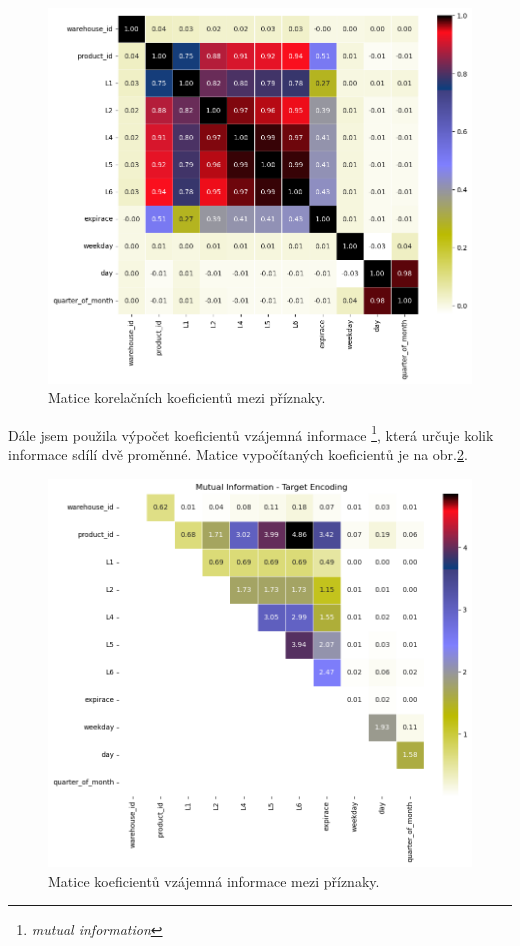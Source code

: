 \begin{figure}[hbtp!]
    \centering
    \includegraphics[width=.8\textwidth]{obrazky/zntb/pearson.png}
    \caption{Matice korelačních koeficientů mezi příznaky.}
    \label{obr:nb:pearson}
\end{figure}

Dále jsem použila výpočet koeficientů vzájemná informace \footnote{\emph{mutual information}}, která určuje kolik informace sdílí dvě proměnné. %
Matice vypočítaných koeficientů je na obr.\ref*{obr:nb:MI}.

\begin{figure}[hbtp!]
    \centering
    \includegraphics[width=.8\textwidth]{obrazky/zntb/MI_TE.png}
    \caption{Matice koeficientů vzájemná informace mezi příznaky.}
    \label{obr:nb:MI}
\end{figure}

